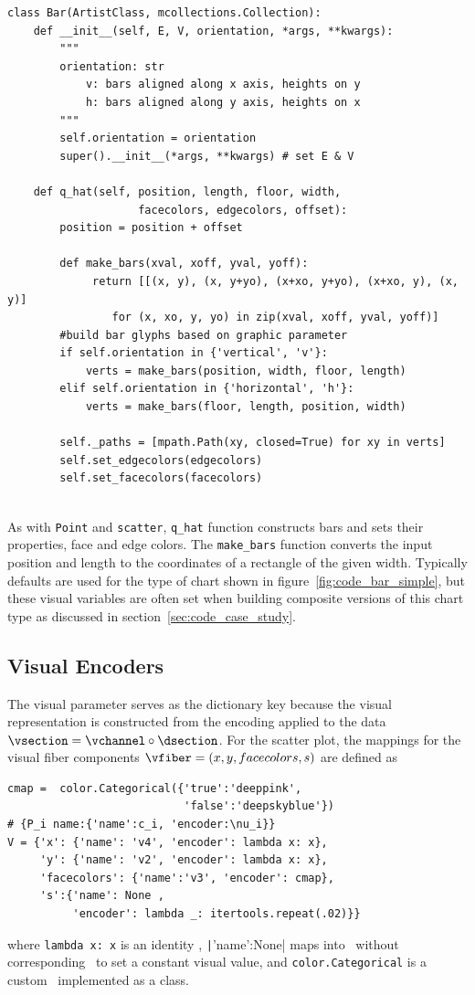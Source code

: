 \documentclass[../main.tex]{subfiles}
\begin{document}
\begin{verbatim}
class Bar(ArtistClass, mcollections.Collection):
    def __init__(self, E, V, orientation, *args, **kwargs):
        """
        orientation: str
            v: bars aligned along x axis, heights on y
            h: bars aligned along y axis, heights on x
        """
        self.orientation = orientation
        super().__init__(*args, **kwargs) # set E & V

    def q_hat(self, position, length, floor, width, 
                    facecolors, edgecolors, offset): 
        position = position + offset
        
        def make_bars(xval, xoff, yval, yoff):
             return [[(x, y), (x, y+yo), (x+xo, y+yo), (x+xo, y), (x, y)] 
                for (x, xo, y, yo) in zip(xval, xoff, yval, yoff)]
        #build bar glyphs based on graphic parameter
        if self.orientation in {'vertical', 'v'}:
            verts = make_bars(position, width, floor, length)
        elif self.orientation in {'horizontal', 'h'}:
            verts = make_bars(floor, length, position, width)
        
        self._paths = [mpath.Path(xy, closed=True) for xy in verts]
        self.set_edgecolors(edgecolors)
        self.set_facecolors(facecolors)
    
\end{verbatim}
 As with \texttt{Point} and \texttt{scatter}, \texttt{q_hat} function constructs bars and sets their properties, face and edge colors. The \texttt{make_bars} function converts the input position and length to the coordinates of a rectangle of the given width.  Typically defaults are used for the type of chart shown in figure~\ref{fig:code_bar_simple}, but these visual variables are often set when building composite versions of this chart type as discussed in section~\ref{sec:code_case_study}. 


\subsection{Visual Encoders}
\label{sec:code:nu}
The visual parameter serves as the dictionary key because the visual representation is constructed from the encoding applied to the data  $\vsection = \vchannel \circ \dsection$. For the scatter plot, the mappings for the visual fiber components $\vfiber=(x,y, facecolors, s)$ are defined as
\begin{verbatim}
cmap =  color.Categorical({'true':'deeppink', 
                           'false':'deepskyblue'}) 
# {P_i name:{'name':c_i, 'encoder:\nu_i}}
V = {'x': {'name': 'v4', 'encoder': lambda x: x}, 
     'y': {'name': 'v2', 'encoder': lambda x: x},
     'facecolors': {'name':'v3', 'encoder': cmap}, 
     's':{'name': None , 
          'encoder': lambda _: itertools.repeat(.02)}}
\end{verbatim}
where \texttt{lambda x: x} is an identity \vchannel, \texttt|{'name':None}| maps into \vfiber\ without corresponding \dsection\ to set a constant visual value, and \texttt{color.Categorical} is a custom \vchannel\ implemented as a class.
\end{document}

